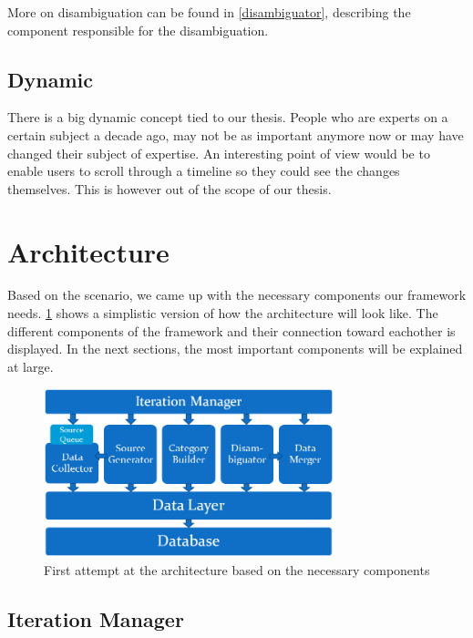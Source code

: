 More on disambiguation can be found in \ref{disambiguator}, describing the component responsible for the disambiguation.

\subsection{Dynamic}

There is a big dynamic concept tied to our thesis. People who are experts on a certain subject a decade ago, may not be as important anymore now or may have changed their subject of expertise. An interesting point of view would be to enable users to scroll through a timeline so they could see the changes themselves. This is however out of the scope of our thesis.

\section{Architecture}

Based on the scenario, we came up with the necessary components our framework needs. \ref{fig:architectuur} shows a simplistic version of how the architecture will look like. The different components of the framework and their connection toward eachother is displayed. In the next sections, the most important components will be explained at large.


\begin{figure}[htbp]
	\centering
		\includegraphics[width=0.75\textwidth]{fig/architectuur.png}
	\caption{First attempt at the architecture based on the necessary components}
	\label{fig:architectuur}
\end{figure}

\subsection{Iteration Manager}

